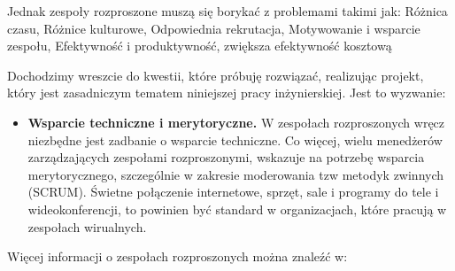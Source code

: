 Jednak zespoły rozproszone muszą się borykać z problemami takimi jak: Różnica czasu, Różnice kulturowe, Odpowiednia rekrutacja,
Motywowanie i wsparcie zespołu, Efektywność i produktywność, zwiększa efektywność kosztową

Dochodzimy wreszcie do kwestii, które próbuję rozwiązać, realizując projekt, który jest zasadniczym tematem niniejszej pracy inżynierskiej. Jest to wyzwanie:

\begin{itemize}
	\item \textbf{Wsparcie techniczne i merytoryczne.}
	W zespołach rozproszonych wręcz niezbędne jest zadbanie o wsparcie techniczne.
	Co więcej, wielu menedżerów zarządzających zespołami rozproszonymi, wskazuje na potrzebę wsparcia merytorycznego,
	szczególnie w zakresie moderowania tzw metodyk zwinnych (SCRUM). Świetne połączenie internetowe,
	sprzęt, sale i programy do tele i wideokonferencji, to powinien być standard w organizacjach, które pracują w zespołach wirualnych.
\end{itemize} 

Więcej informacji o zespołach rozproszonych można znaleźć w:\cite{www_rozproszony}